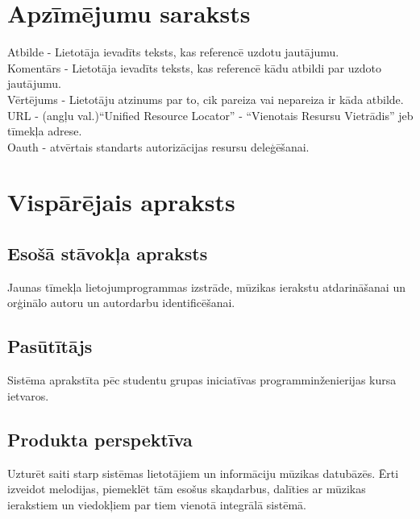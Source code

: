\documentclass[12pt]{article}
\begin{document}
\section*{Apzīmējumu saraksts}

\noindent Atbilde - Lietotāja ievadīts teksts, kas referencē uzdotu jautājumu.\\
Komentārs - Lietotāja ievadīts teksts, kas referencē kādu atbildi par uzdoto jautājumu.\\
Vērtējums - Lietotāju atzinums par to, cik pareiza vai nepareiza ir kāda atbilde.\\
URL - (angļu val.)``Unified Resource Locator'' - ``Vienotais Resursu Vietrādis'' jeb tīmekļa adrese.\\
Oauth - atvērtais standarts autorizācijas resursu deleģēšanai.\\

\pagebreak

\section{Vispārējais apraksts}

\subsection{Esošā stāvokļa apraksts}

Jaunas tīmekļa lietojumprogrammas izstrāde, mūzikas ierakstu atdarināšanai un orģinālo autoru un autordarbu identificēšanai.

\subsection{Pasūtītājs}

Sistēma aprakstīta pēc studentu grupas iniciatīvas programminženierijas kursa ietvaros.

\subsection{Produkta perspektīva}

Uzturēt saiti starp sistēmas lietotājiem un informāciju mūzikas datubāzēs. Ērti izveidot melodijas, piemeklēt tām esošus skaņdarbus, dalīties ar mūzikas ierakstiem un viedokļiem par tiem vienotā integrālā sistēmā.
\end{document}
